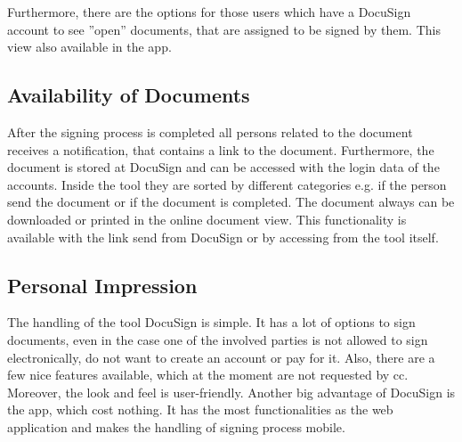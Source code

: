 Furthermore, there are the options for those users which have a DocuSign account to see ''open'' documents, that are assigned to be signed by them. This view also available in the \gls{app}.

\subsection{Availability of Documents}
After the signing process is completed all persons related to the document receives a notification, that contains a link to the document. Furthermore, the document is stored at DocuSign and can be accessed with the login data of the accounts. Inside the tool they are sorted by different categories e.g. if the person send the document or if the document is completed. The document always can be downloaded or printed in the online document view. This functionality is available with the link send from DocuSign or by accessing from the tool itself.

\subsection{Personal Impression}
The handling of the tool DocuSign is simple. It has a lot of options to sign documents, even in the case one of the involved parties is not allowed to sign electronically, do not want to create an account or pay for it. Also, there are a few nice features available, which at the moment are not requested by \gls{cc}. Moreover, the look and feel is user-friendly. Another big advantage of DocuSign is the \gls{app}, which cost nothing. It has the most functionalities as the web application and makes the handling of signing process mobile.
